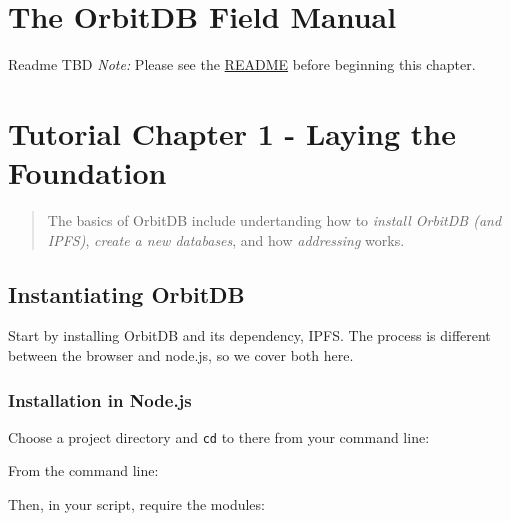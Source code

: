\section{The OrbitDB Field Manual}\label{the-orbitdb-field-manual}

Readme TBD \emph{Note:} Please see the \href{./README.md}{README} before
beginning this chapter.

\section{Tutorial Chapter 1 - Laying the
Foundation}\label{tutorial-chapter-1---laying-the-foundation}

\begin{quote}
The basics of OrbitDB include undertanding how to \emph{install OrbitDB
(and IPFS)}, \emph{create a new databases}, and how \emph{addressing}
works.
\end{quote}

\subsection{Instantiating OrbitDB}\label{instantiating-orbitdb}

Start by installing OrbitDB and its dependency, IPFS. The process is
different between the browser and node.js, so we cover both here.

\subsubsection{Installation in Node.js}\label{installation-in-node.js}

Choose a project directory and \texttt{cd} to there from your command
line:

From the command line:

\begin{Shaded}
\begin{Highlighting}[]
\NormalTok{$ }
\end{Highlighting}
\end{Shaded}

Then, in your script, require the modules:

\begin{Shaded}
\begin{Highlighting}[]
\OperatorTok{=} \NormalTok{(}\NormalTok{)}
\OperatorTok{=} \NormalTok{(}\NormalTok{)}
\end{Highlighting}
\end{Shaded}

